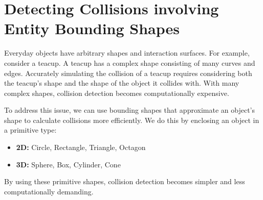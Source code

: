 \chapter{Detecting Collisions involving Entity Bounding Shapes}
Everyday objects have arbitrary shapes and interaction surfaces. For example,
consider a teacup. A teacup has a complex shape consisting of many curves and
edges. Accurately simulating the collision of a teacup requires considering
both the teacup's shape and the shape of the object it collides with. With many
complex shapes, collision detection becomes computationally expensive.

To address this issue, we can use bounding shapes that approximate an object's
shape to calculate collisions more efficiently. We do this by enclosing an
object in a primitive type:
\begin{itemize}
    \item \textbf{2D:} Circle, Rectangle, Triangle, Octagon
    \item \textbf{3D:} Sphere, Box, Cylinder, Cone
\end{itemize}

By using these primitive shapes, collision detection becomes simpler and less
computationally demanding.



